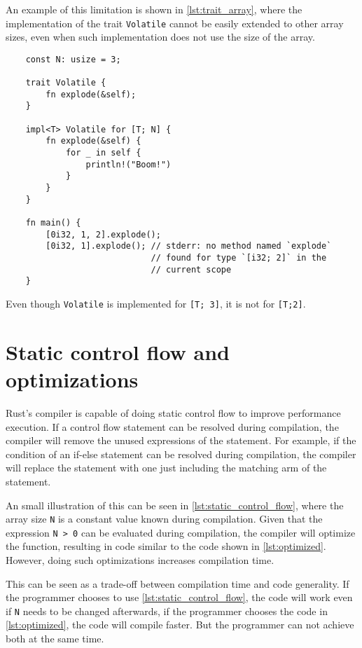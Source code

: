 An example of this limitation is shown in \ref{lst:trait_array}, where the implementation of the trait \texttt{Volatile} cannot be easily extended to other array sizes, even when such implementation does not use the size of the array. 

\begin{listing}
	\begin{verbatim} 
    const N: usize = 3;

    trait Volatile {
        fn explode(&self);
    }

    impl<T> Volatile for [T; N] {
        fn explode(&self) {
            for _ in self {
                println!("Boom!")
            }
        }
    }

    fn main() {
        [0i32, 1, 2].explode(); 
        [0i32, 1].explode(); // stderr: no method named `explode` 
                             // found for type `[i32; 2]` in the
                             // current scope
    }
	\end{verbatim}
    \caption{Even though \texttt{Volatile} is implemented for \texttt{[T; 3]}, it is not for \texttt{[T;2]}.}
  \label{lst:trait_array}
\end{listing}

\section{Static control flow and optimizations}
Rust's compiler is capable of doing static control flow to improve performance execution. If a control flow statement can be resolved during compilation, the compiler will remove the unused expressions of the statement. For example, if the condition of an if-else statement can be resolved during compilation, the compiler will replace the statement with one just including the matching arm of the statement.

An small illustration of this can be seen in \ref{lst:static_control_flow}, where the array size \texttt{N} is a constant value known during compilation. Given that the expression  \texttt{N > 0} can be evaluated during compilation, the compiler will optimize the function, resulting in code similar to the code shown in \ref{lst:optimized}. However, doing such optimizations increases compilation time. 

This can be seen as a trade-off between compilation time and code generality. If the programmer chooses to use \ref{lst:static_control_flow}, the code will work even if \texttt{N} needs to be changed afterwards, if the programmer chooses the code in \ref{lst:optimized}, the code will compile faster. But the programmer can not achieve both at the same time.


